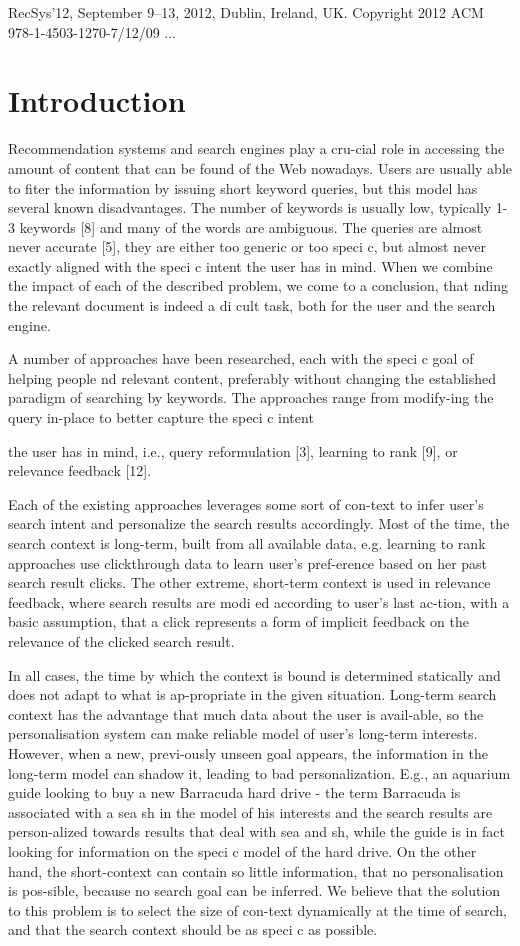 \documentclass{acm_proc_article-sp} %
\begin{document}
RecSys’12, September 9–13, 2012, Dublin, Ireland, UK.
Copyright 2012 ACM 978-1-4503-1270-7/12/09 ...%


\section{Introduction}

Recommendation systems and search engines play a cru-cial role in accessing the amount of content that can be found of the Web nowadays. Users are usually able to fiter the information by issuing short keyword queries, but this model has several known disadvantages. The number of keywords is usually low, typically 1-3 keywords [8] and many of the words are ambiguous. The queries are almost never accurate [5], they are either too generic or too speci c, but almost never exactly aligned with the speci c intent the user has in mind. When we combine the impact of each of the described problem, we come to a conclusion, that nding the relevant document is indeed a di cult task, both for the user and the search engine.

A number of approaches have been researched, each with the speci c goal of helping people nd relevant content, preferably without changing the established paradigm of searching by keywords. The approaches range from modify-ing the query in-place to better capture the speci c intent

the user has in mind, i.e., query reformulation [3], learning to rank [9], or relevance feedback [12].

Each of the existing approaches leverages some sort of con-text to infer user's search intent and personalize the search results accordingly. Most of the time, the search context is long-term, built from all available data, e.g. learning to rank approaches use clickthrough data to learn user's pref-erence based on her past search result clicks. The other extreme, short-term context is used in relevance feedback, where search results are modi ed according to user's last ac-tion, with a basic assumption, that a click represents a form of implicit feedback on the relevance of the clicked search result.

In all cases, the time by which the context is bound is determined statically and does not adapt to what is ap-propriate in the given situation. Long-term search context has the advantage that much data about the user is avail-able, so the personalisation system can make reliable model of user's long-term interests. However, when a new, previ-ously unseen goal appears, the information in the long-term model can shadow it, leading to bad personalization. E.g., an aquarium guide looking to buy a new Barracuda hard drive - the term Barracuda is associated with a sea sh in the model of his interests and the search results are person-alized towards results that deal with sea and sh, while the guide is in fact looking for information on the speci c model of the hard drive. On the other hand, the short-context can contain so little information, that no personalisation is pos-sible, because no search goal can be inferred. We believe that the solution to this problem is to select the size of con-text dynamically at the time of search, and that the search context should be as speci c as possible.
\end{document}
